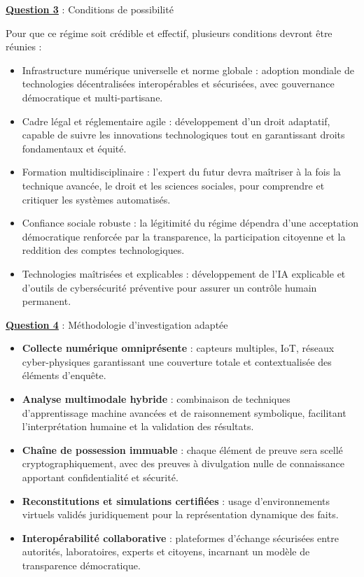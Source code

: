 \documentclass[12pt, a4paper]{article}
\newcommand{\question}[1]{\textbf{\underline{Question #1}}}
\begin{document}
\begin{enumerate}[label=\textbf{\arabic*.}, start=6]
		\question{3} : Conditions de possibilité
		
		Pour que ce régime soit crédible et effectif, plusieurs conditions devront être réunies :
		
		\begin{itemize}
			\item Infrastructure numérique universelle et norme globale : adoption mondiale de technologies décentralisées interopérables et sécurisées, avec gouvernance démocratique et multi-partisane.
			\item Cadre légal et réglementaire agile : développement d'un droit adaptatif, capable de suivre les innovations technologiques tout en garantissant droits fondamentaux et équité.
			\item Formation multidisciplinaire : l'expert du futur devra maîtriser à la fois la technique avancée, le droit et les sciences sociales, pour comprendre et critiquer les systèmes automatisés.
			\item Confiance sociale robuste : la légitimité du régime dépendra d'une acceptation démocratique renforcée par la transparence, la participation citoyenne et la reddition des comptes technologiques.
			\item Technologies maîtrisées et explicables : développement de l'IA explicable et d'outils de cybersécurité préventive pour assurer un contrôle humain permanent.
		\end{itemize}
		
		\question{4} : Méthodologie d'investigation adaptée
		
		\begin{itemize}
			\item \textbf{Collecte numérique omniprésente} : capteurs multiples, IoT, réseaux cyber-physiques garantissant une couverture totale et contextualisée des éléments d'enquête.
			\item \textbf{Analyse multimodale hybride} : combinaison de techniques d'apprentissage machine avancées et de raisonnement symbolique, facilitant l'interprétation humaine et la validation des résultats.
			\item \textbf{Chaîne de possession immuable} : chaque élément de preuve sera scellé cryptographiquement, avec des preuves à divulgation nulle de connaissance apportant confidentialité et sécurité.
			\item \textbf{Reconstitutions et simulations certifiées} : usage d'environnements virtuels validés juridiquement pour la représentation dynamique des faits.
			\item \textbf{Interopérabilité collaborative} : plateformes d'échange sécurisées entre autorités, laboratoires, experts et citoyens, incarnant un modèle de transparence démocratique.
		\end{itemize}
		

\end{enumerate}
\end{document}
